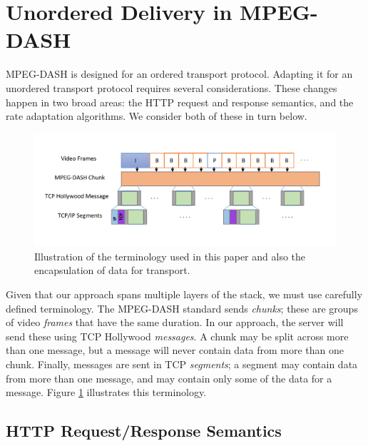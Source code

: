 \section{Unordered Delivery in MPEG-DASH}
\label{sec:transport}

MPEG-DASH is designed for an ordered transport protocol. Adapting it for an
unordered transport protocol requires several considerations. These
changes happen in two broad areas: the HTTP request and response semantics, and the rate
adaptation algorithms. We consider both of these in turn below.

\begin{figure}
  \centering
  \includegraphics[width=\columnwidth]{figures/terminology2.pdf}
  \caption{Illustration of the terminology used in this paper and also the encapsulation of data for transport.}
  \label{fig:terminology}
\end{figure}

Given that our approach spans multiple layers of the stack, we must use carefully defined
terminology. The MPEG-DASH standard sends \emph{chunks}; these are groups of video
\emph{frames} that have the same duration. In our approach, the server will send these
using TCP Hollywood \emph{messages}. A chunk may be split across more than one message,
but a message will never contain data from more than one chunk. Finally, messages are
sent in TCP \emph{segments}; a segment may contain data from more than one message, and
may contain only some of the data for a message.
Figure \ref{fig:terminology} illustrates this terminology.

\subsection{HTTP Request/Response Semantics}


